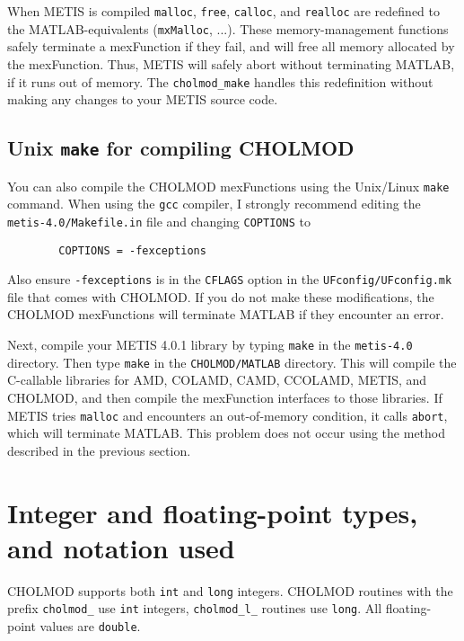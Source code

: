 \documentclass[11pt]{article}
\begin{document}
When METIS is compiled {\tt malloc}, {\tt free}, {\tt calloc}, and {\tt realloc}
are redefined to the MATLAB-equivalents ({\tt mxMalloc}, ...).
These memory-management functions safely terminate a mexFunction if they
fail, and will free all memory allocated by the mexFunction.
Thus, METIS will safely abort without terminating MATLAB, if it runs out
of memory.
The {\tt cholmod\_make} handles this redefinition without making any
changes to your METIS source code.

\subsection{Unix {\tt make} for compiling CHOLMOD}

You can also compile the CHOLMOD mexFunctions using the Unix/Linux {\tt make}
command.  When using the {\tt gcc} compiler, I strongly recommend editing the
{\tt metis-4.0/Makefile.in} file and changing {\tt COPTIONS} to
\begin{verbatim}
        COPTIONS = -fexceptions
\end{verbatim}
Also ensure {\tt -fexceptions} is in the {\tt CFLAGS} option in the
{\tt UFconfig/UFconfig.mk} file that comes with CHOLMOD.
If you do not make these modifications, the CHOLMOD mexFunctions
will terminate MATLAB if they encounter an error.

Next, compile your METIS 4.0.1 library by typing {\tt make} in the
{\tt metis-4.0} directory.  Then type {\tt make} in the {\tt CHOLMOD/MATLAB}
directory.  This will compile the C-callable libraries for
AMD, COLAMD, CAMD, CCOLAMD, METIS, and CHOLMOD, and then compile the
mexFunction interfaces to those libraries.
If METIS tries {\tt malloc} and encounters an out-of-memory condition,
it calls {\tt abort}, which will terminate MATLAB.  This problem does not
occur using the method described in the previous section.

\newpage \section{Integer and floating-point types, and notation used}

CHOLMOD supports both {\tt int} and {\tt long} integers.  CHOLMOD
routines with the prefix {\tt cholmod\_} use {\tt int} integers,
{\tt cholmod\_l\_} routines use {\tt long}.  All floating-point
values are {\tt double}.
\end{document}
